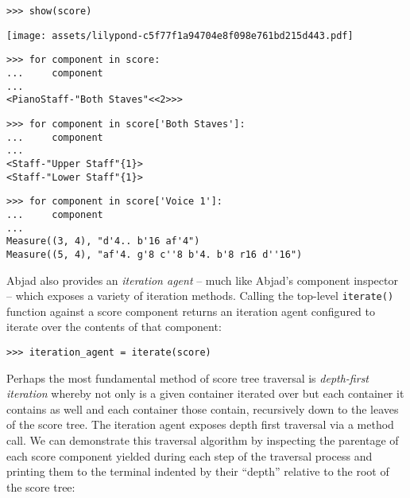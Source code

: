 \begin{abjadbookoutput}
\begin{singlespacing}
\vspace{-0.5\baselineskip}
\begin{verbatim}
>>> show(score)
\end{verbatim}
\noindent\texttt{[image: assets/lilypond-c5f77f1a94704e8f098e761bd215d443.pdf]}
\begin{verbatim}
>>> for component in score:
...     component
...
<PianoStaff-"Both Staves"<<2>>>
\end{verbatim}
\begin{verbatim}
>>> for component in score['Both Staves']:
...     component
...
<Staff-"Upper Staff"{1}>
<Staff-"Lower Staff"{1}>
\end{verbatim}
\begin{verbatim}
>>> for component in score['Voice 1']:
...     component
...
Measure((3, 4), "d'4.. b'16 af'4")
Measure((5, 4), "af'4. g'8 c''8 b'4. b'8 r16 d''16")
\end{verbatim}
\end{singlespacing}
\end{abjadbookoutput}

\noindent Abjad also provides an \emph{iteration agent} -- much like Abjad's
component inspector -- which exposes a variety of iteration methods. Calling
the top-level \texttt{iterate()} function against a score component returns an
iteration agent configured to iterate over the contents of that component:

\begin{comment}
<abjad>
iteration_agent = iterate(score)
</abjad>
\end{comment}

\begin{abjadbookoutput}
\begin{singlespacing}
\vspace{-0.5\baselineskip}
\begin{verbatim}
>>> iteration_agent = iterate(score)
\end{verbatim}
\end{singlespacing}
\end{abjadbookoutput}

\noindent Perhaps the most fundamental method of score tree traversal is
\emph{depth-first iteration}\cite{cormen2009introduction} whereby not only is a
given container iterated over but each container it contains as well and each
container those contain, recursively down to the leaves of the score tree. The
iteration agent exposes depth first traversal via a method call. We can
demonstrate this traversal algorithm by inspecting the parentage of each score
component yielded during each step of the traversal process and printing them
to the terminal indented by their \enquote{depth} relative to the root of the
score tree:

